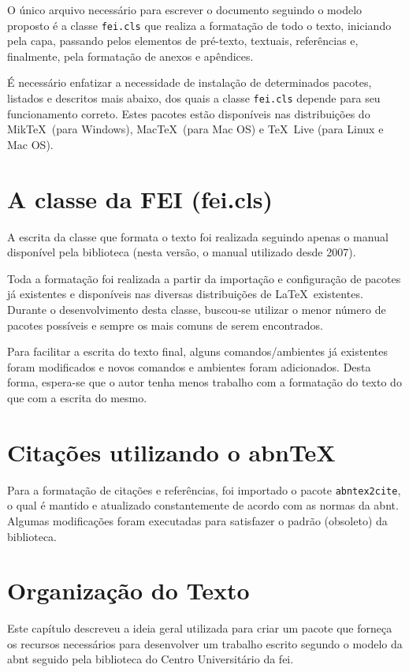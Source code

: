 \documentclass{fei}
\begin{document}
O único arquivo necessário para escrever o documento seguindo o modelo proposto é a classe \texttt{fei.cls} que realiza a formatação de todo o texto, iniciando pela capa, passando pelos elementos de pré-texto, textuais, referências e, finalmente, pela formatação de anexos e apêndices.

É necessário enfatizar a necessidade de instalação de determinados pacotes, listados e descritos mais abaixo, dos quais a classe \texttt{fei.cls} depende para seu funcionamento correto. Estes pacotes estão disponíveis nas distribuições do Mik\TeX~(para Windows), Mac\TeX~(para Mac OS) e \TeX~Live (para Linux e Mac OS).

\section{A classe da FEI (fei.cls)}

A escrita da classe que formata o texto foi realizada seguindo apenas o manual disponível pela biblioteca (nesta versão, o manual utilizado desde 2007).

Toda a formatação foi realizada a partir da importação e configuração de pacotes já existentes e disponíveis nas diversas distribuições de \LaTeX~existentes. Durante o desenvolvimento desta classe, buscou-se utilizar o menor número de pacotes possíveis e sempre os mais comuns de serem encontrados.

Para facilitar a escrita do texto final, alguns comandos/ambientes já existentes foram modificados e novos comandos e ambientes foram adicionados. Desta forma, espera-se que o autor tenha menos trabalho com a formatação do texto do que com a escrita do mesmo.

\section{Citações utilizando o abn\TeX}

Para a formatação de citações e referências, foi importado o pacote \texttt{abntex2cite}, o qual é mantido e atualizado constantemente de acordo com as normas da \gls{abnt}. Algumas modificações foram executadas para satisfazer o padrão (obsoleto) da biblioteca.

\section{Organização do Texto}

Este capítulo descreveu a ideia geral utilizada para criar um pacote que forneça os recursos necessários para desenvolver um trabalho escrito segundo o modelo da \gls{abnt} seguido pela biblioteca do Centro Universitário da \gls{fei}.
\end{document}
